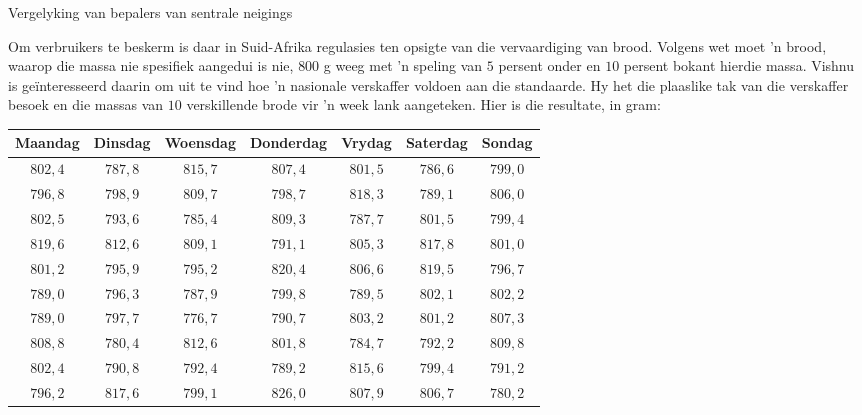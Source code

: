\begin{wex}{
Vergelyking van bepalers van sentrale neigings
}
{Om verbruikers te beskerm is daar in Suid-Afrika regulasies ten opsigte van die vervaardiging van brood. Volgens wet moet ’n brood, waarop die massa nie spesifiek aangedui is nie, $800$ g weeg met ’n speling van $5$ persent onder en $10$ persent bokant hierdie massa. Vishnu is geïnteresseerd daarin om uit te vind hoe ’n nasionale verskaffer voldoen aan die standaarde. Hy het die plaaslike tak van die verskaffer besoek en die massas van $10$ verskillende brode vir ’n week lank aangeteken. Hier is die resultate, in gram:\\

    \begin{center}
      \begin{tabular}{|c|c|c|c|c|c|c|} \hline
       
        \textbf{Maandag} & \textbf{Dinsdag} & \textbf{Woensdag} & \textbf{ Donderdag} & \textbf{Vrydag} & \textbf{Saterdag} & \textbf{Sondag} \\ \hline
        
        $802,4$ & $787,8$ & $815,7$ & $807,4$ & $801,5$ & $786,6$ & $799,0$ \\ \hline
        $796,8$ & $798,9$ & $809,7$ & $798,7$ & $818,3$ & $789,1$ & $806,0$ \\ \hline
        $802,5$ & $793,6$ & $785,4$ & $809,3$ & $787,7$ & $801,5$ & $799,4$ \\ \hline
        $819,6$ & $812,6$ & $809,1$ & $791,1$ & $805,3$ & $817,8$ & $801,0$ \\ \hline
        $801,2$ & $795,9$ & $795,2$ & $820,4$ & $806,6$ & $819,5$ & $796,7$ \\ \hline
        $789,0$ & $796,3$ & $787,9$ & $799,8$ & $789,5$ & $802,1$ & $802,2$ \\ \hline
        $789,0$ & $797,7$ & $776,7$ & $790,7$ & $803,2$ & $801,2$ & $807,3$ \\ \hline
        $808,8$ & $780,4$ & $812,6$ & $801,8$ & $784,7$ & $792,2$ & $809,8$ \\ \hline
        $802,4$ & $790,8$ & $792,4$ & $789,2$ & $815,6$ & $799,4$ & $791,2$ \\ \hline
        $796,2$ & $817,6$ & $799,1$ & $826,0$ & $807,9$ & $806,7$ & $780,2$ \\ \hline
       

\end{tabular}
\end{center}}
\end{wex}
